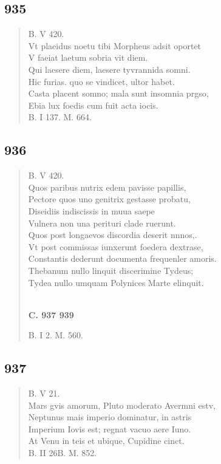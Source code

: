 \documentclass[11pt, a4paper]{report}
\begin{document}
            \subsection*{935}
      \begin{verse}
      B. V 420. \\ Vt plaeidus noetu tibi Morpheus adsit oportet \\ V faeiat laetum sobria vit diem. \\ Qui laesere diem, laesere tyvrannida somni. \\ Hic furias. quo se vindicet, ultor habet. \\ Casta placent somno; mala sunt insomnia prgso, \\ Ebia lux foedis cum fuit acta iocis. \\ B. I 137. M. 664. \\ 
      \end{verse}
  
            \subsection*{936}
      \begin{verse}
      B. V 420. \\ Quos paribus nutrix edem pavisse papillis, \\ Pectore quos uno genitrix gestasse probatu, \\ Diseidiis indiscissis in muua saepe \\ Vulnera non una perituri clade ruerunt. \\ Quos post longaevos discordia deserit nnnos,. \\ Vt post commissas iunxerunt foedera dextrase, \\ Constantis dederunt documenta frequenler amoris. \\ Thebanum nullo linquit discerimine Tydeus; \\ Tydea nullo umquam Polynices Marte elinquit. \\ 
        ﻿\pagebreak 
     \marginpar{[360]} \begin{center} \textbf{C. 937 939} \end{center}B. I 2. M. 560. \\ 
      \end{verse}
  
            \subsection*{937}
      \begin{verse}
      B. V 21. \\ Mars gvis amorum, Pluto moderato Avermni estv, \\ Neptunus mais imperio dominatur, in astris \\ Imperium Iovis est; regnat vacuo aere Iuno. \\ At Venu in teis et ubique, Cupidine cinct. \\ B. II 26B. M. 852. \\ 
      \end{verse}
  
\end{document}
